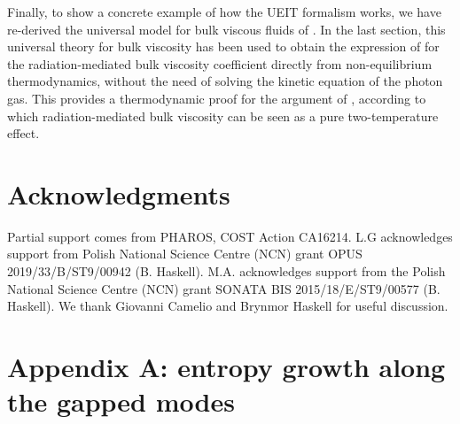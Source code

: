 \documentclass[a4paper, amsfonts, amssymb, amsmath, reprint, twocolumn, showkeys, nofootinbib]{revtex4-2}
\begin{document}
Finally, to show a concrete example of how the UEIT formalism works, we have re-derived the universal  model for bulk viscous fluids of \citet{BulkGavassino}. In the last section, this universal theory for bulk viscosity has been used to obtain the expression of \citet{Weinberg1971} for the  radiation-mediated bulk viscosity coefficient directly from non-equilibrium thermodynamics, without the need of solving the kinetic equation of the photon gas. This provides a thermodynamic proof for the argument of \citet{UdeyIsrael1982}, according to which radiation-mediated bulk viscosity can be seen as a pure two-temperature effect.

 
\section*{Acknowledgments}
Partial support comes from PHAROS, COST Action CA16214. L.G acknowledges support from Polish National Science Centre (NCN) grant OPUS 2019/33/B/ST9/00942 (B. Haskell). M.A. acknowledges support from the Polish National Science Centre (NCN) grant SONATA BIS 2015/18/E/ST9/00577 (B. Haskell). 
We thank Giovanni Camelio and Brynmor Haskell for useful discussion. 
 
 
\appendix


\section{Appendix A: entropy growth along the gapped modes}\label{entropyplots}
\end{document}

